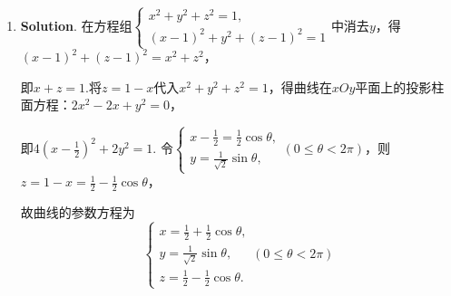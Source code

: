 \documentclass[../main.tex]{subfiles}
\begin{document}
\begin{enumerate}
          令其与平面$\pi:x-4y-8z+12=0$垂直，得
          \[
              (1+\lambda)\cdot 1+5\cdot(-4)+(1-\lambda
              )\cdot(-8) = 0,
          \]
          解得$\lambda=3$.所以直线$L$在平面$\pi$上的投影直线的方程为
          \[
              \begin{cases}
                  4x+5y-2z+12=0, \\
                  x-4y-8z+12=0.
              \end{cases}
          \]

    \item \textbf{Solution}. 在方程组$\begin{cases}
                  x^{2}+y^{2}+z^{2}=1, \\
                  (x-1)^{2}+y^{2}+(z-1)^{2}=1
              \end{cases}$中消去$y$，得$(x-1)^{2}+(z-1)^{2}=x^{2}+z^{2}$，

          即$x+z=1$.将$z=1-x$代入$x^{2}+y^{2}+z^{2}=1$，得曲线在$xOy$平面上的投影柱面方程：$2
              x^{2}-2x+y^{2}=0$，

          即$4\left(x-\frac{1}{2}\right)^{2}+2y^{2}=1$. 令$\begin{cases}
                  x-\frac{1}{2} = \frac{1}{2}\cos \theta, \\[4.5pt]
                  y = \frac{1}{\sqrt{2}}\sin \theta,
              \end{cases}(0\leq \theta < 2\pi)$，则$z=1-x=\frac{1}{2}-\frac{1}{2}\cos\theta$，

          故曲线的参数方程为
          \[
              \begin{cases}
                  x = \frac{1}{2}+\frac{1}{2}\cos \theta, \\[6pt]
                  y = \frac{1}{\sqrt{2}}\sin \theta,      \\[6pt]
                  z = \frac{1}{2}-\frac{1}{2}\cos \theta.
              \end{cases}(0\leq \theta < 2\pi)
          \]


\end{enumerate}
\end{document}
